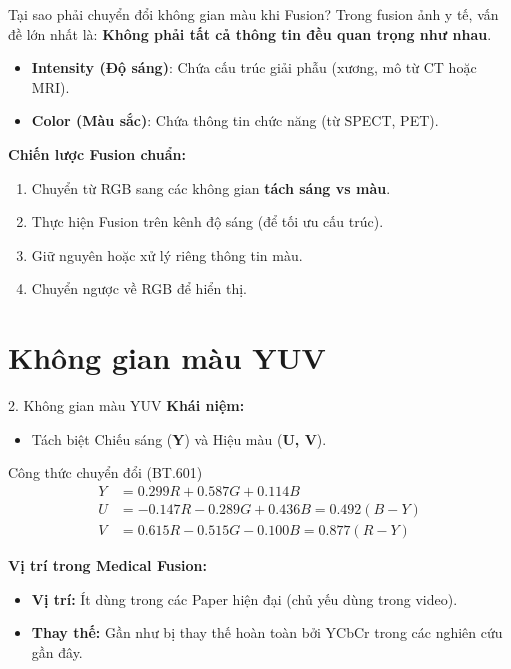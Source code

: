 \documentclass{beamer}
\begin{document}
\begin{frame}{Tại sao phải chuyển đổi không gian màu khi Fusion?}
    Trong fusion ảnh y tế, vấn đề lớn nhất là: \textbf{Không phải tất cả thông tin đều quan trọng như nhau}.
    \begin{itemize}
        \item \textbf{Intensity (Độ sáng)}: Chứa cấu trúc giải phẫu (xương, mô từ CT hoặc MRI).
        \item \textbf{Color (Màu sắc)}: Chứa thông tin chức năng (từ SPECT, PET).
    \end{itemize}
    
    \vspace{0.3cm}
    \textbf{Chiến lược Fusion chuẩn:}
    \begin{enumerate}
        \item Chuyển từ RGB sang các không gian \textbf{tách sáng vs màu}.
        \item Thực hiện Fusion trên kênh độ sáng (để tối ưu cấu trúc).
        \item Giữ nguyên hoặc xử lý riêng thông tin màu.
        \item Chuyển ngược về RGB để hiển thị.
    \end{enumerate}
\end{frame}

\section{Không gian màu YUV}

\begin{frame}{2. Không gian màu YUV}
    \textbf{Khái niệm:}
    \begin{itemize}
        \item Tách biệt Chiếu sáng (\textbf{Y}) và Hiệu màu (\textbf{U, V}).
    \end{itemize}
    
    \begin{block}{Công thức chuyển đổi (BT.601)}
    \begin{equation}
    \begin{aligned}
        Y &= 0.299R + 0.587G + 0.114B \\
        U &= -0.147R - 0.289G + 0.436B = 0.492(B - Y) \\
        V &= 0.615R - 0.515G - 0.100B = 0.877(R - Y)
    \end{aligned}
    \end{equation}
    \end{block}

    \vspace{0.2cm}
    \textbf{Vị trí trong Medical Fusion:}
    \begin{itemize}
        \item \textbf{Vị trí:} Ít dùng trong các Paper hiện đại (chủ yếu dùng trong video).
        \item \textbf{Thay thế:} Gần như bị thay thế hoàn toàn bởi YCbCr trong các nghiên cứu gần đây.
    \end{itemize}
\end{frame}
\end{document}
